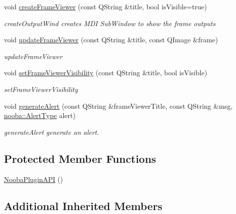 \begin{DoxyCompactItemize}
\item 
void \hyperlink{class_nooba_plugin_a_p_i_af9e086f20d23a152a36a5f9712f6a343}{create\-Frame\-Viewer} (const Q\-String \&title, bool is\-Visible=true)
\begin{DoxyCompactList}\small\item\em create\-Output\-Wind creates M\-D\-I Sub\-Window to show the frame outputs \end{DoxyCompactList}\item 
void \hyperlink{class_nooba_plugin_a_p_i_a25e896b4e43bf5d686400d8aae366203}{update\-Frame\-Viewer} (const Q\-String \&title, const Q\-Image \&frame)
\begin{DoxyCompactList}\small\item\em update\-Frame\-Viewer \end{DoxyCompactList}\item 
void \hyperlink{class_nooba_plugin_a_p_i_a39a561779352c0e29af6c5c8b2d2dd60}{set\-Frame\-Viewer\-Visibility} (const Q\-String \&title, bool is\-Visible)
\begin{DoxyCompactList}\small\item\em set\-Frame\-Viewer\-Visibility \end{DoxyCompactList}\item 
void \hyperlink{class_nooba_plugin_a_p_i_a643a07495d139b132bf52a27dda6ff09}{generate\-Alert} (const Q\-String \&frame\-Viewer\-Title, const Q\-String \&msg, \hyperlink{namespacenooba_a1e392455e0e2d24934ea87baaf5eb43c}{nooba\-::\-Alert\-Type} alert)
\begin{DoxyCompactList}\small\item\em generate\-Alert generate an alert. \end{DoxyCompactList}\end{DoxyCompactItemize}
\subsection*{Protected Member Functions}
\begin{DoxyCompactItemize}
\item 
\hyperlink{class_nooba_plugin_a_p_i_aa90d35a9c2407032281b65b780ffd08a}{Nooba\-Plugin\-A\-P\-I} ()
\end{DoxyCompactItemize}
\subsection*{Additional Inherited Members}


